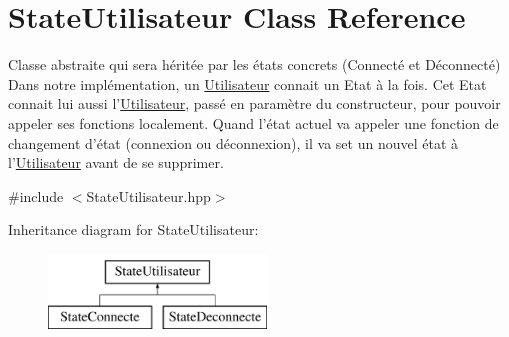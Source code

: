 \hypertarget{classStateUtilisateur}{\section{State\-Utilisateur Class Reference}
\label{classStateUtilisateur}
}


Classe abstraite qui sera héritée par les états concrets (Connecté et Déconnecté) Dans notre implémentation, un \hyperlink{classUtilisateur}{Utilisateur} connait un Etat à la fois. Cet Etat connait lui aussi l'\hyperlink{classUtilisateur}{Utilisateur}, passé en paramètre du constructeur, pour pouvoir appeler ses fonctions localement. Quand l'état actuel va appeler une fonction de changement d'état (connexion ou déconnexion), il va set un nouvel état à l'\hyperlink{classUtilisateur}{Utilisateur} avant de se supprimer.  




{\ttfamily \#include $<$State\-Utilisateur.\-hpp$>$}

Inheritance diagram for State\-Utilisateur\-:\begin{figure}[H]
\begin{center}
\leavevmode
\includegraphics[height=2.000000cm]{classStateUtilisateur}
\end{center}
\end{figure}
